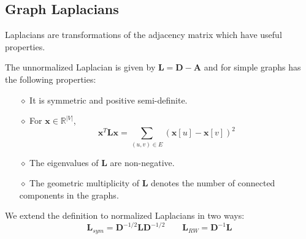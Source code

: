 \subsection{Graph Laplacians}
Laplacians are transformations of the adjacency matrix which have useful properties.
\begin{definition}
	The unnormalized Laplacian is given by $\mathbf{L} = \mathbf{D}-\mathbf{A}$ and for simple graphs has the following properties:
	\begin{itemize}
		\item[$\diamond$] It is symmetric and positive semi-definite.
		\item[$\diamond$] For $\mathbf{x} \in \mathbb{R}^{|V|}$, \begin{equation}
			\mathbf{x}^T\mathbf{Lx} = \sum_{(u,v)\in E} (\mathbf{x}[u] - \mathbf{x}[v])^2
		\end{equation}
		\item[$\diamond$] The eigenvalues of $\mathbf{L}$ are non-negative.
		\item[$\diamond$] The geometric multiplicity of $\mathbf{L}$ denotes the number of connected components in the graphs.
	\end{itemize}
\end{definition}
We extend the definition to normalized Laplacians in two ways:
\begin{equation}
	\mathbf{L}_{sym} = \mathbf{D}^{-1/2}\mathbf{L}\mathbf{D}^{-1/2} \qquad \mathbf{L}_{RW} = \mathbf{D}^{-1}\mathbf{L}
\end{equation}
